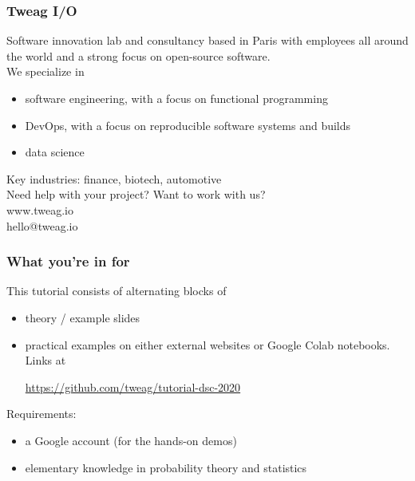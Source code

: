\documentclass[t,aspectratio=169]{beamer}
\begin{document}
\begin{frame}
  \frametitle{Tweag I/O}
  Software innovation lab and consultancy based in Paris with employees all around the world and a strong focus on open-source software.\\
  \bigskip
  We specialize in
  \begin{itemize}
  \item software engineering, with a focus on functional programming
  \item DevOps, with a focus on reproducible software systems and builds
  \item data science
  \end{itemize}
  Key industries: finance, biotech, automotive\\
  \bigskip
  Need help with your project? Want to work with us?\\
  \bigskip
  \centering
  www.tweag.io\\
  \bigskip
  hello@tweag.io
\end{frame}


\begin{frame}
  \frametitle{What you're in for}
  This tutorial consists of alternating blocks of
  \begin{itemize}
  \item theory / example slides
  \item practical examples on either external websites or Google Colab notebooks. Links at
    \begin{center}
      \url{https://github.com/tweag/tutorial-dsc-2020}
    \end{center}
  \end{itemize}

  Requirements:
  \begin{itemize}
  \item a Google account (for the hands-on demos)
  \item elementary knowledge in probability theory and statistics
  \end{itemize}
\end{frame}


\end{document}
